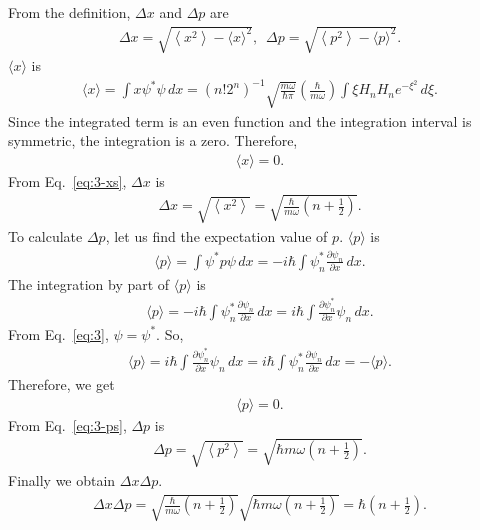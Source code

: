 \documentclass[floatfix,nofootinbib,superscriptaddress,fleqn]{revtex4-2}
\begin{document}
\begin{itemize}
  From the definition, $\Delta x$ and $\Delta p$ are
  \begin{align}
      \Delta x = \sqrt{\left\langle x^2\right\rangle 
      - {\langle x\rangle}^2  },\,\,\,
      \Delta p = \sqrt{\left\langle p^2\right\rangle 
      - {\langle p\rangle}^2  }.
  \end{align}
  $\langle x\rangle$ is
  \begin{align}
      \langle x\rangle = \int x\psi^*\psi\,dx 
      = (n!2^n)^{-1}\sqrt{\frac{m\omega}{\hbar\pi}}
      \left(\frac{\hbar}{m\omega}\right)
      \int \xi H_n H_n e^{-\xi^2}\,d\xi.
  \end{align}
  Since the integrated term is an even function and the integration 
  interval is symmetric,
  the integration is a zero. Therefore,
  \begin{align}
    \langle x\rangle = 0.
  \end{align}
  From Eq.~\eqref{eq:3-xs}, $\Delta x$ is
  \begin{align}
    \Delta x = \sqrt{\left\langle x^2\right\rangle}
    = \sqrt{\frac{\hbar}{m\omega}
    \left( n+\frac{1}{2}\right)}.
  \end{align}
  To calculate $\Delta p$, let us find the expectation value of $p$.
  $\langle p\rangle$ is
  \begin{align}
    \langle p\rangle = \int \psi^*p\psi\,dx
    = -i\hbar\int\psi^*_n
    \frac{\partial \psi_n}{\partial x} \,dx.
  \end{align}
  The integration by part of $\langle p\rangle$ is
  \begin{align}
      \langle p\rangle=-i\hbar\int\psi^*_n
      \frac{\partial \psi_n}{\partial x} \,dx
      =i\hbar\int\frac{\partial \psi^*_n}{\partial x}
      \psi_n \,dx.
  \end{align}
  From Eq.~\eqref{eq:3}, $\psi = \psi^*$. So,
  \begin{align}
    \langle p\rangle=i\hbar\int\frac{\partial \psi^*_n}{\partial x}
    \psi_n \,dx=i\hbar\int\psi^*_n
    \frac{\partial \psi_n}{\partial x}\,dx = -\langle p\rangle.
  \end{align}
  Therefore, we get
  \begin{align}
    \langle p\rangle = 0.
  \end{align}
  From Eq.~\eqref{eq:3-ps}, $\Delta p$ is
  \begin{align}
    \Delta p = \sqrt{\left\langle p^2\right\rangle}
    = \sqrt{\hbar m\omega\left( n+\frac{1}{2} \right)}.
  \end{align}
  Finally we obtain $\Delta x\Delta p$.
  \begin{align}
    \Delta x\Delta p = \sqrt{\frac{\hbar}{m\omega}
    \left(n+\frac{1}{2}\right)}\sqrt{\hbar m\omega
    \left(n+\frac{1}{2}\right)}
    =\hbar\left(n+\frac{1}{2}\right).
  \end{align}
\end{itemize}
\end{document}
